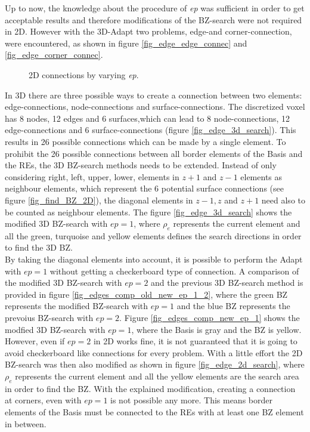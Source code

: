 Up to now, the knowledge about the procedure of \textit{ep} was sufficient in
 order to get acceptable results and therefore modifications of the BZ-search were
 not required in 2D. However with the 3D-Adapt two problems, edge-and corner-connection, were encountered, as shown in figure
 \ref{fig_edge_edge_connec} and \ref{fig_edge_corner_connec}.\\


\begin{figure}[!h]
 \centering
 \def\svgwidth{\textwidth}
  
 \caption{2D connections by varying  \emph{ep}.} %
 \label{fig_2dcorner_conections}
 \end{figure}
 
In 3D there are three possible ways to create a connection between two
 elements: edge-connections, node-connections and surface-connections. The
 discretized voxel has 8 nodes, 12 edges and 6 surfaces,which can lead to 8 node-connections, 12 edge-connections and 6 surface-connections
 (figure \ref{fig_edge_3d_search}). This results in 26 possible 
 connections which can be made by a single element.
To prohibit the 26 possible connections between all border elements of the Basis
 and the REs, the 3D BZ-search methods needs to be extended. Instead of
 only considering right, left, upper, lower, elements in $z + 1$ and $z - 1$ elements
 as neighbour elements, which represent
 the 6 potential surface connections
 (see figure \ref{fig_find_BZ_2D}), the diagonal elements
 in $z-1, z$ and $z+1$ need also to be counted as neighbour elements. The figure
 \ref{fig_edge_3d_search} shows the modified 3D BZ-search with $ep =1$, where
 $\rho_e$ represents the current element and all the green, turquoise and
 yellow elements defines the search directions in order to find the 3D BZ.\\
 
  By taking the diagonal elements into account, it is possible to perform the Adapt
 with $ep = 1$ without
 getting a checkerboard type of connection.
 A comparison of the modified 3D BZ-search with $ep = 2$
 and the previous 3D BZ-search method is provided in figure \ref{fig_edges_comp_old_new_ep_1_2}, where the green BZ represents the modified BZ-search with $ep = 1$ and the blue BZ represents the prevoius BZ-search with $ep = 2$.
 Figure \ref{fig_edges_comp_new_ep_1}
 shows the modfied 3D BZ-search with $ep = 1$, where 
 the Basis is gray and the BZ is yellow.
  However, even if $ep = 2$ in 2D works fine, it is not guaranteed that 
 it is going to avoid checkerboard like connections for every problem.
 With a little effort the 
 2D BZ-search was then also modified as shown in 
 figure \ref{fig_edge_2d_search}, where $\rho_e$ represents 
 the current element and all the yellow elements are
 the search area in order to find the BZ.
 With the explained modification, creating a connection
 at corners, even with $ep = 1$ is not
 possible any more. This means border elements 
 of the Basis must be connected to the REs with at least one BZ element in between.\\
 

